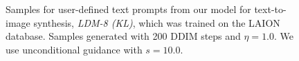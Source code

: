{\begin{figure}[htbp]
\begin{tabular}{ccccccc}
%
%
%
%
%
%
%
%
%
%
%
%
%
	\bottomrule
	\end{tabular}
\caption{\label{fig:text2img_samples} Samples for user-defined text prompts from our model for text-to-image synthesis, \emph{LDM-8 (KL)}, which was trained on the LAION~\cite{schuhmann2021laion400m} database. Samples generated with 200 DDIM steps and $\eta = 1.0$. We use unconditional guidance \cite{ho2021classifier} with $s=10.0$.}
%
\end{figure}
}







